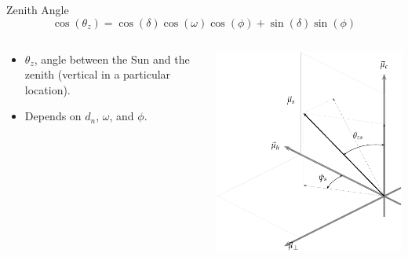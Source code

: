 \documentclass[xcolor={usenames,svgnames,dvipsnames}]{beamer}
\begin{document}
\begin{frame}[label={sec:orga653523},plain]{Zenith Angle}
\[
\boxed{\cos(\theta_{z}) = \cos(\delta) \cos(\omega) \cos(\phi) + \sin(\delta) \sin(\phi)}
\]


\begin{columns}
\begin{column}{0.6\columnwidth}
\begin{itemize}
\item \(\theta_z\), angle between the Sun and the zenith (vertical in a particular location).
\item Depends on \(d_n\), \(\omega\), and \(\phi\).
\end{itemize}
\end{column}
\begin{column}{0.7\columnwidth}
\begin{center}
\includegraphics[width=.9\linewidth]{../figs/SistemaCoordenadasLocal-crop.pdf}
\end{center}
\end{column}
\end{columns}
\end{frame}
\end{document}
